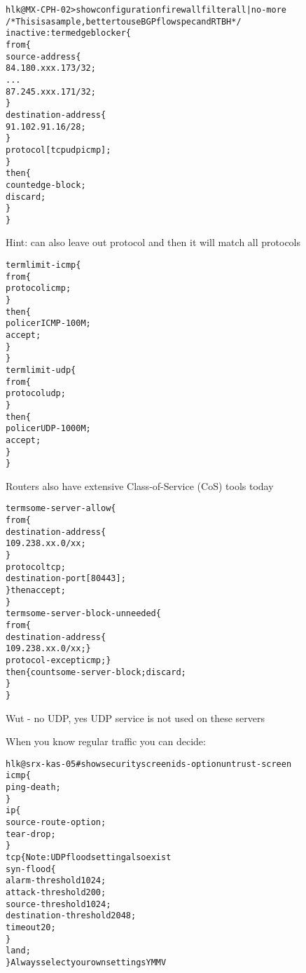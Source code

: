 \documentclass[Screen16to9,17pt]{foils}
\begin{document}

\begin{alltt}\footnotesize
hlk@MX-CPH-02> show configuration firewall filter all | no-more
/* This is a sample, better to use BGP flowspec and RTBH */
inactive: term edgeblocker \{
    from \{
        source-address \{
            84.180.xxx.173/32;
...
            87.245.xxx.171/32;
        \}
        destination-address \{
            91.102.91.16/28;
        \}
        protocol [ tcp udp icmp ];
    \}
    then \{
        count edge-block;
        discard;
    \}
\}
\end{alltt}
Hint: can also leave out protocol and then it will match all protocols


\begin{alltt}\footnotesize
term limit-icmp \{
    from \{
        protocol icmp;
    \}
    then \{
        policer ICMP-100M;
        accept;
    \}
\}
term limit-udp \{
    from \{
        protocol udp;
    \}
    then \{
        policer UDP-1000M;
        accept;
    \}
\}
\end{alltt}

Routers also have extensive Class-of-Service (CoS) tools today


\begin{alltt}\footnotesize
term some-server-allow \{
    from \{
        destination-address \{
            109.238.xx.0/xx;
        \}
        protocol tcp;
        destination-port [ 80 443 ];
    \} then accept;
\}
term some-server-block-unneeded \{
    from \{
        destination-address \{
            109.238.xx.0/xx; \}
        protocol-except icmp;  \}
    then \{ count some-server-block; discard;
    \}
\}
\end{alltt}

Wut - no UDP, yes UDP service is not used on these servers



When you know regular traffic you can decide:

\begin{alltt}\footnotesize
hlk@srx-kas-05# show security screen ids-option untrust-screen
icmp \{
    ping-death;
\}
ip \{
    source-route-option;
    tear-drop;
\}
tcp \{    Note: UDP flood setting also exist
    syn-flood \{
        alarm-threshold 1024;
        attack-threshold 200;
        source-threshold 1024;
        destination-threshold 2048;
        timeout 20;
    \}
    land;
\} Always select your own settings YMMV
\end{alltt}
\end{document}
